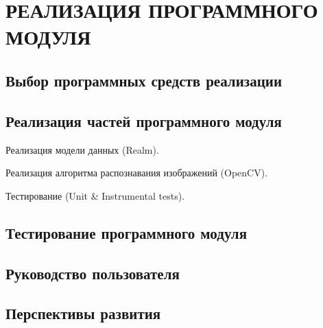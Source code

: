 \section[Реализация программного модуля]{%
  РЕАЛИЗАЦИЯ ПРОГРАММНОГО МОДУЛЯ
}\label{sec:implementation}

\subsection{Выбор программных средств реализации}

\subsection{Реализация частей программного модуля}
Реализация  модели данных (Realm).

Реализация алгоритма распознавания изображений (OpenCV).

Тестирование (Unit \& Instrumental tests).

\subsection{Тестирование  программного модуля}

\subsection{Руководство пользователя}

\subsection{Перспективы развития}